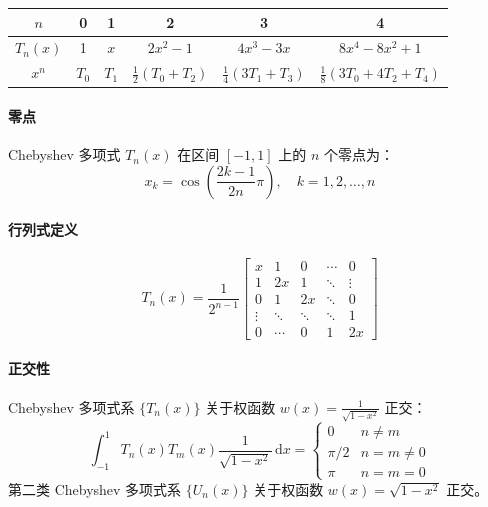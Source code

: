 \begin{table}[H]
    \centering
    \begin{tabular}{c|ccccc}
        \hline
        \(n\)                       & 0       & 1       & 2                          & 3             & 4 \\
        \hline
        \(T_n(x)\)                  & 1       & \(x\)   & \(2x^2 - 1\)               & \(4x^3 - 3x\) &
        \(8x^4 - 8x^2 + 1\) \\
        \(x^n\)                     & \(T_0\) & \(T_1\) & \(\frac{1}{2}(T_0 + T_2)\) &
        \(\frac{1}{4}(3T_1 + T_3)\) & \(\frac{1}{8}(3T_0 + 4T_2 +
        T_4)\) \\
        \hline
    \end{tabular}
\end{table}

\paragraph{零点}
Chebyshev 多项式 \(T_n(x)\) 在区间 \([-1, 1]\) 上的 \(n\) 个零点为：
\[
    x_k = \cos\left(\frac{2k-1}{2n}\pi\right), \quad k = 1, 2, \dots, n
\]

\paragraph{行列式定义}
\[
    T_n(x) = \frac{1}{2^{n-1}}
    \begin{bmatrix}
        x &1 &0 &\cdots &0 \\
        1 &2x &1 &\ddots &\vdots \\
        0 &1 &2x &\ddots &0 \\
        \vdots &\ddots &\ddots &\ddots &1 \\
        0 &\cdots &0 &1 &2x
    \end{bmatrix}
\]

\paragraph{正交性}
Chebyshev 多项式系 \(\{T_n(x)\}\) 关于权函数 \(w(x) =
\frac{1}{\sqrt{1-x^2}}\) 正交：
\[
    \int_{-1}^1 T_n(x) T_m(x) \frac{1}{\sqrt{1-x^2}} \,
    \mathrm{d}x =
    \begin{cases}
        0 & n \neq m \\
        \pi/2 & n = m \neq 0 \\
        \pi & n = m = 0
    \end{cases}
\]
第二类 Chebyshev 多项式系 \(\{U_n(x)\}\) 关于权函数 \(w(x) =
\sqrt{1-x^2}\) 正交。

